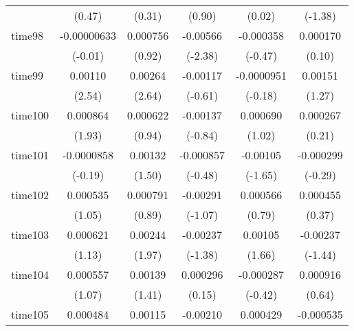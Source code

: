 \begin{table}[htbp]
\begin{tabular}{l*{5}{c}}
            &      (0.47)         &      (0.31)         &      (0.90)         &      (0.02)         &     (-1.38)         \\
time98      & -0.00000633         &    0.000756         &    -0.00566\sym{*}  &   -0.000358         &    0.000170         \\
            &     (-0.01)         &      (0.92)         &     (-2.38)         &     (-0.47)         &      (0.10)         \\
time99      &     0.00110\sym{*}  &     0.00264\sym{**} &    -0.00117         &  -0.0000951         &     0.00151         \\
            &      (2.54)         &      (2.64)         &     (-0.61)         &     (-0.18)         &      (1.27)         \\
time100     &    0.000864         &    0.000622         &    -0.00137         &    0.000690         &    0.000267         \\
            &      (1.93)         &      (0.94)         &     (-0.84)         &      (1.02)         &      (0.21)         \\
time101     &  -0.0000858         &     0.00132         &   -0.000857         &    -0.00105         &   -0.000299         \\
            &     (-0.19)         &      (1.50)         &     (-0.48)         &     (-1.65)         &     (-0.29)         \\
time102     &    0.000535         &    0.000791         &    -0.00291         &    0.000566         &    0.000455         \\
            &      (1.05)         &      (0.89)         &     (-1.07)         &      (0.79)         &      (0.37)         \\
time103     &    0.000621         &     0.00244\sym{*}  &    -0.00237         &     0.00105         &    -0.00237         \\
            &      (1.13)         &      (1.97)         &     (-1.38)         &      (1.66)         &     (-1.44)         \\
time104     &    0.000557         &     0.00139         &    0.000296         &   -0.000287         &    0.000916         \\
            &      (1.07)         &      (1.41)         &      (0.15)         &     (-0.42)         &      (0.64)         \\
time105     &    0.000484         &     0.00115         &    -0.00210         &    0.000429         &   -0.000535         \\

\end{tabular}
\end{table}
